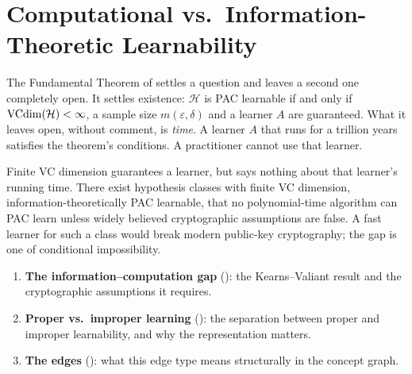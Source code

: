 
\chapter{Computational vs.\ Information-Theoretic Learnability}
\label{ch:computational}

The Fundamental Theorem of  settles a question and leaves a
second one completely open.  It settles existence: $\mathcal{H}$ is PAC
learnable if and only if $\mathrm{VCdim}(\mathcal{H}) < \infty$, a sample size
$m(\varepsilon, \delta)$ and a learner $A$ are guaranteed.  What it leaves
open, without comment, is \emph{time}.  A learner $A$ that runs for a
trillion years satisfies the theorem's conditions.  A practitioner cannot use
that learner.

Finite VC dimension guarantees a learner, but says nothing about that
learner's running time.  There exist hypothesis classes with finite VC
dimension, information-theoretically PAC learnable, that no polynomial-time
algorithm can PAC learn unless widely believed cryptographic assumptions are
false.  A fast learner for such a class would break modern public-key
cryptography; the gap is one of conditional impossibility.

\begin{enumerate}[leftmargin=*,itemsep=2pt]
\item \textbf{The information--computation gap} (): the
  Kearns--Valiant result and the cryptographic assumptions it requires.
\item \textbf{Proper vs.\ improper learning} (): the
  separation between proper and improper learnability, and why the
  representation matters.
\item \textbf{The  edges}
  (): what this edge type means structurally in
  the concept graph.
\end{enumerate}



